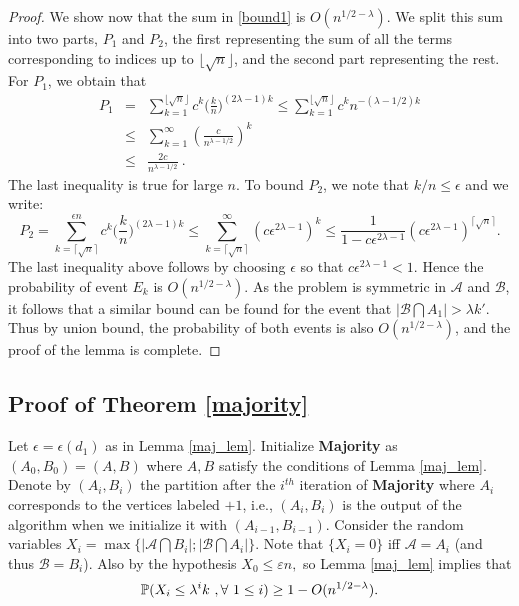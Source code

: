 \documentclass[11pt,reqno]{amsart}
\newcommand{\e}{\varepsilon}
\begin{document}
\begin{proof}
We show now that the sum in \eqref{bound1}   is $O(n^{1/2-\lambda})$. We split this sum into two parts,
$P_1$ and $P_2$, the first representing the sum of all the terms corresponding to indices up to $\lfloor \sqrt{n} \rfloor$, and the second part
representing the rest. For $P_1$, we obtain that 
\begin{eqnarray*}
P_1 & = & \sum_{k=1}^{\lfloor \sqrt{n} \rfloor} c^k
\Big(\frac{k}{n}\Big)^{(2\lambda-1)k}\leq \sum_{k=1}^{\lfloor
  \sqrt{n} \rfloor}
c^k n^{-(\lambda-1/2)k}\\
&  \leq & \sum_{k=1}^{\infty} \left (
  \frac{c}{n^{\lambda - 1/2}} \right)^k \\
& \leq & \frac{2c}{n^{\lambda-1/2}}~.
\end{eqnarray*}
The last inequality is true for large $n$. To bound $P_2$, we note that $k/n \leq \epsilon$ and we write: 
\[
P_2 = \sum_{k=\lceil \sqrt{n} \rceil}^{\epsilon n}
c^k\Big(\frac{k}{n}\Big)^{(2\lambda-1)k}\leq \sum_{k=\lceil \sqrt{n}
\rceil}^{\infty} (c\epsilon^{2\lambda-1})^k\leq
\frac{1}{1-c\epsilon^{2\lambda-1}}(c\epsilon^{2\lambda-1})^{\lceil
  \sqrt{n} \rceil}.
\] 
The last inequality above follows by choosing $\epsilon$ so that $c \epsilon^{2 \lambda-1}
<1$. 
Hence the probability of event $E_k$ is $O
\left(n^{1/2 -\lambda}\right).$
As the problem is symmetric in $\mathcal{A}$ and $\mathcal{B}$, it
follows that a similar bound can be found for the event that
$|\mathcal{B} \bigcap A_1| > \lambda k'$. Thus by union bound,
the probability of both events is also $O\left(n^{1/2 -\lambda}\right)$,
 and the proof of the lemma is complete.
\end{proof}

\subsection{Proof of Theorem \ref{majority}}\label{proof_majority}
Let $\epsilon=\epsilon(d_1)$ as in Lemma \ref{maj_lem}. Initialize \textbf{Majority} as $({A}_0,{B}_0)=(A,B)$ where $A, B$ satisfy the conditions of Lemma \ref{maj_lem}. Denote by $({A}_i,{B}_i)$ the partition after the $i^{th}$ iteration of \textbf{Majority} where $A_i$ corresponds to the vertices labeled $+1$, i.e., $(A_i,B_i)$ is the output of the algorithm when we initialize it with $({A}_{i-1},{B}_{i-1})$.
Consider the random variables
$
X_i=\max\{ |\mathcal{A}\bigcap {B}_i|;|\mathcal{B}\bigcap {A}_i|  \}.$
Note that $\{X_i=0\}$ iff $\mathcal{A}={A}_i$ (and thus
$\mathcal{B}={B}_i$). Also by the hypothesis $X_0 \le \e n,$ so Lemma \ref{maj_lem} implies that
\[
\P(X_i\leq \lambda^i k~,\forall~ 1 \leq i )\geq 1-O(n^{1/2-\lambda}).
\]
\end{document}
